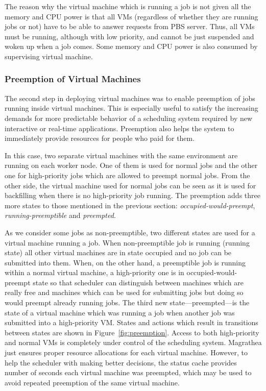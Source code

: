 \documentclass{sigplanconf}
\begin{document}
The reason why the virtual machine which is running a job is not given all the
memory and CPU power is that all VMs (regardless of whether they are running
jobs or not) have to be able to answer requests from PBS server. Thus, all VMs
must be running, although with low priority, and cannot be just suspended and
woken up when a job comes. Some memory and CPU power is also consumed by
supervising virtual machine.

\subsubsection{Preemption of Virtual Machines}

The second step in deploying virtual machines was to enable preemption of jobs
running inside virtual machines. This is especially useful to satisfy the
increasing demands for more predictable behavior of a scheduling system
required by new interactive or real-time applications. Preemption also helps
the system to immediately provide resources for people who paid for them.

In this case, two separate virtual machines with the same environment are
running on each worker node. One of them is used for normal jobs and the other
one for high-priority jobs which are allowed to preempt normal jobs. From the
other side, the virtual machine used for normal jobs can be seen as it is used
for backfilling when there is no high-priority job running. The preemption
adds three more states to those mentioned in the previous section:
\textit{occupied-would-preempt}, \textit{running-preemptible} and
\textit{preempted}.

As we consider some jobs as non-preemptible, two different states are used for
a virtual machine running a job. When non-preemptible job is running (running
state) all other virtual machines are in state occupied and no job can be
submitted into them. When, on the other hand, a preemptible job is running
within a normal virtual machine, a high-priority one is in
occupied-would-preempt state so that scheduler can distinguish between
machines which are really free and machines which can be used for submitting
jobs but doing so would preempt already running jobs. The third new
state---preempted---is the state of a virtual machine which was running a job
when another job was submitted into a high-priority VM. States and actions
which result in transitions between states are shown in
Figure~\ref{fig:preemption}. Access to both high-priority and normal VMs is
completely under control of the scheduling system. Magrathea just ensures
proper resource allocations for each virtual machine. However, to help the
scheduler with making better decisions, the status cache provides number of
seconds each virtual machine was preempted, which may be used to avoid
repeated preemption of the same virtual machine.
\end{document}
